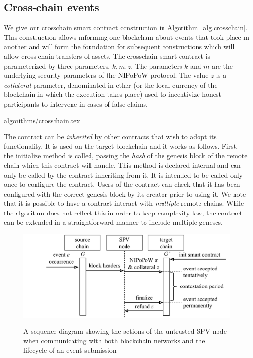 \subsection*{Cross-chain events}

We give our \textsf{crosschain} smart contract construction in
Algorithm~\ref{alg.crosschain}. This construction allows informing one
blockchain about events that took place in another and will form the foundation
for subsequent constructions which will allow cross-chain transfers of
assets. The \textsf{crosschain} smart contract is parameterized by three
parameters, $k, m, z$. The parameters $k$ and $m$ are the underlying security
parameters of the NIPoPoW protocol. The value $z$ is a \emph{collateral}
parameter, denominated in ether (or the local currency of the blockchain in
which the execution takes place) used to incentivize honest participants to
intervene in cases of false claims.

{algorithms/crosschain.tex}

The contract can be \emph{inherited} by other contracts that wish to adopt its
functionality. It is used on the target blockchain and it works as follows.
First, the \textsf{initialize} method is called, passing the \emph{hash} of the
genesis block of the remote chain which this contract will handle. This method
is declared \textsf{internal} and can only be called by the contract inheriting
from it. It is intended to be called only once to configure the contract. Users
of the contract can check that it has been configured with the correct genesis
block by its creator prior to using it. We note that it is possible to have a
contract interact with \emph{multiple} remote chains. While the algorithm does
not reflect this in order to keep complexity low, the contract can be extended
in a straightforward manner to include multiple geneses.

\begin{figure}[H]
    \caption{A sequence diagram showing the actions of the untrusted SPV node
             when communicating with both blockchain networks and the lifecycle
             of an event submission}
    \centering
    \includegraphics[width=0.9 \columnwidth,keepaspectratio]{figures/sequence-diagram.pdf}
    \label{fig.sequence}
\end{figure}

